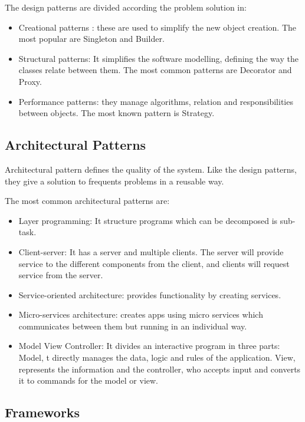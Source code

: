 \documentclass[12pt]{report} %
\begin{document}
The design patterns are divided according the problem solution in:

\begin{itemize}
	\item Creational patterns : these are used to simplify the new object creation. The most popular are Singleton and Builder.
	\item Structural patterns: It simplifies the software modelling, defining the way the classes relate between them. The most common patterns are Decorator and Proxy.
	\item Performance patterns: they manage algorithms, relation and responsibilities between objects. The most known pattern is Strategy.	
\end{itemize}

\subsection{Architectural Patterns}

Architectural pattern defines the quality of the system. Like the design patterns, they give a solution to frequents problems in a reusable way. 

The most common architectural patterns are:
\begin{itemize}
	\item Layer programming: It structure programs which can be decomposed is sub-task. 
	\item Client-server: It has a server and multiple clients. The server will provide service to the different components from the client, and clients will request service from the server.
	\item Service-oriented architecture: provides functionality by creating services. 
	\item Micro-services architecture: creates apps using micro services which communicates between them but running in an individual way.
	\item Model View Controller:  It divides an interactive program in three parts: Model, t directly manages the data, logic and rules of the application. View, represents the information and the controller, who  accepts input and converts it to commands for the model or view.
	
\end{itemize}

\subsection{Frameworks}
\end{document}
